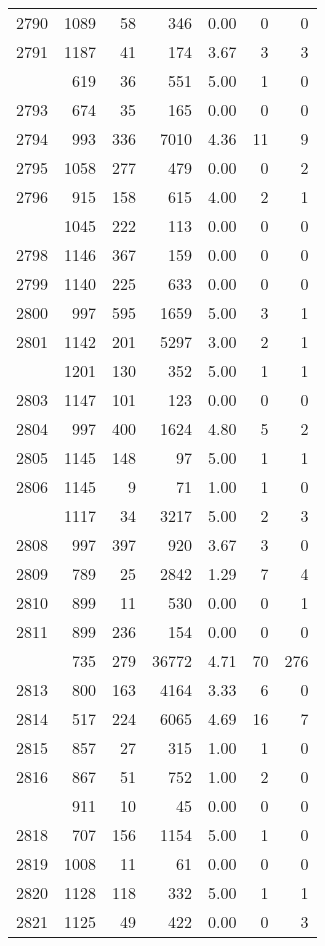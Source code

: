 \documentclass[
]{article}
\begin{document}
\begin{table}
\begin{tabular}[t]{lrrrrrr}
2790 & 1089 & 58 & 346 & 0.00 & 0 & 0\\
2791 & 1187 & 41 & 174 & 3.67 & 3 & 3\\
\addlinespace
2792 & 619 & 36 & 551 & 5.00 & 1 & 0\\
2793 & 674 & 35 & 165 & 0.00 & 0 & 0\\
2794 & 993 & 336 & 7010 & 4.36 & 11 & 9\\
2795 & 1058 & 277 & 479 & 0.00 & 0 & 2\\
2796 & 915 & 158 & 615 & 4.00 & 2 & 1\\
\addlinespace
2797 & 1045 & 222 & 113 & 0.00 & 0 & 0\\
2798 & 1146 & 367 & 159 & 0.00 & 0 & 0\\
2799 & 1140 & 225 & 633 & 0.00 & 0 & 0\\
2800 & 997 & 595 & 1659 & 5.00 & 3 & 1\\
2801 & 1142 & 201 & 5297 & 3.00 & 2 & 1\\
\addlinespace
2802 & 1201 & 130 & 352 & 5.00 & 1 & 1\\
2803 & 1147 & 101 & 123 & 0.00 & 0 & 0\\
2804 & 997 & 400 & 1624 & 4.80 & 5 & 2\\
2805 & 1145 & 148 & 97 & 5.00 & 1 & 1\\
2806 & 1145 & 9 & 71 & 1.00 & 1 & 0\\
\addlinespace
2807 & 1117 & 34 & 3217 & 5.00 & 2 & 3\\
2808 & 997 & 397 & 920 & 3.67 & 3 & 0\\
2809 & 789 & 25 & 2842 & 1.29 & 7 & 4\\
2810 & 899 & 11 & 530 & 0.00 & 0 & 1\\
2811 & 899 & 236 & 154 & 0.00 & 0 & 0\\
\addlinespace
2812 & 735 & 279 & 36772 & 4.71 & 70 & 276\\
2813 & 800 & 163 & 4164 & 3.33 & 6 & 0\\
2814 & 517 & 224 & 6065 & 4.69 & 16 & 7\\
2815 & 857 & 27 & 315 & 1.00 & 1 & 0\\
2816 & 867 & 51 & 752 & 1.00 & 2 & 0\\
\addlinespace
2817 & 911 & 10 & 45 & 0.00 & 0 & 0\\
2818 & 707 & 156 & 1154 & 5.00 & 1 & 0\\
2819 & 1008 & 11 & 61 & 0.00 & 0 & 0\\
2820 & 1128 & 118 & 332 & 5.00 & 1 & 1\\
2821 & 1125 & 49 & 422 & 0.00 & 0 & 3\\

\end{tabular}
\end{table}
\end{document}
